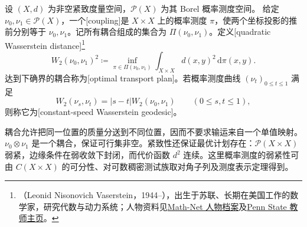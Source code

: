 \begin{definition}\label{g3:def:quadratic-transport-distance}
	设 \((X,d)\) 为非空紧致度量空间，\(\mathcal P(X)\) 为其 Borel 概率测度空间。
	给定 \(\nu_0,\nu_1\in\mathcal P(X)\)，一个[coupling]是 \(X\times X\) 上的概率测度 \(\pi\)，使两个坐标投影的推前分别等于 \(\nu_0,\nu_1\)。记所有耦合组成的集合为 \(\Pi(\nu_0,\nu_1)\)。定义[quadratic Wasserstein distance]\footnote{（Leonid Nisonovich Vaserstein，1944--），出生于苏联、长期在美国工作的数学家，研究代数与动力系统；人物资料见\href{https://www.mathnet.ru/php/person.phtml?option_lang=eng\&personid=23042}{Math-Net 人物档案}及\href{https://science.psu.edu/math/people/lxv1}{Penn State 教师主页}。}
	\begin{equation}\label{g3:eq:wasserstein-two}
		W_2(\nu_0,\nu_1)^2\coloneqq
		\inf_{\pi\in\Pi(\nu_0,\nu_1)}
		\int_{X\times X}d(x,y)^2\,\mathrm d\pi(x,y).
	\end{equation}
	达到下确界的耦合称为[optimal transport plan]。若概率测度曲线 \((\nu_t)_{0\le t\le1}\) 满足
	\[
		W_2(\nu_s,\nu_t)=|s-t|W_2(\nu_0,\nu_1)
		\qquad(0\le s,t\le1),
	\]
	则称它为[constant-speed Wasserstein geodesic]。
\end{definition}

耦合允许把同一位置的质量分送到不同位置，因而不要求输运来自一个单值映射。\(\nu_0\otimes\nu_1\) 是一个耦合，保证可行集非空。紧致性还保证最优计划存在：\(\mathcal P(X\times X)\) 弱紧，边缘条件在弱收敛下封闭，而代价函数 \(d^2\) 连续。这里概率测度的弱紧性可由 \(C(X\times X)\) 的可分性、对可数稠密测试族取对角子列及测度表示定理得到。

